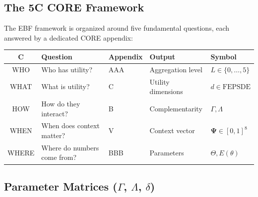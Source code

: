 

\subsection{The 5C CORE Framework}
\label{sec:glossary-5c}

The EBF framework is organized around five fundamental questions, each 
answered by a dedicated CORE appendix:

\begin{center}
\renewcommand{\arraystretch}{1.3}
\begin{tabular}{@{}cllll@{}}
\toprule
\textbf{C} & \textbf{Question} & \textbf{Appendix} & \textbf{Output} & \textbf{Symbol} \\
\midrule
WHO & Who has utility? & AAA & Aggregation level & $L \in \{0,\ldots,5\}$ \\
WHAT & What is utility? & C & Utility dimensions & $d \in \text{FEPSDE}$ \\
HOW & How do they interact? & B & Complementarity & $\Gamma, \Lambda$ \\
WHEN & When does context matter? & V & Context vector & $\boldsymbol{\Psi} \in [0,1]^8$ \\
WHERE & Where do numbers come from? & BBB & Parameters & $\Theta, E(\theta)$ \\
\bottomrule
\end{tabular}
\end{center}

\subsection{Parameter Matrices ($\Gamma$, $\Lambda$, $\delta$)}
\label{sec:glossary-matrices}

